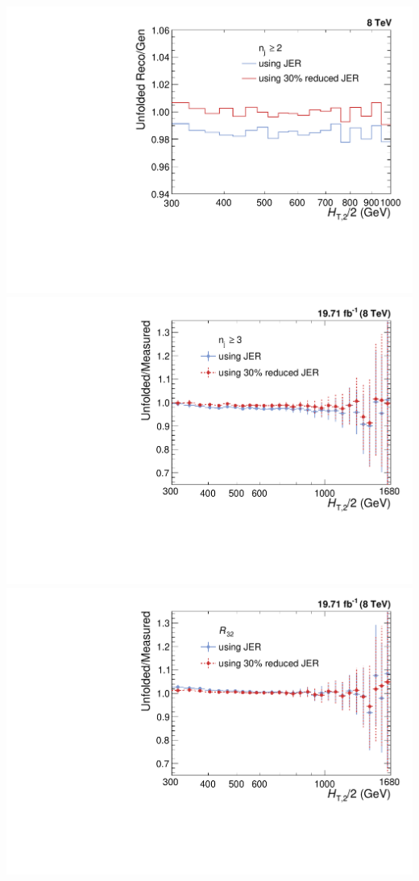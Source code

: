 \documentclass{beamer}
\begin{document}
\begin{frame}
\begin{minipage}[tbp]{0.15\textwidth}
\includegraphics[scale = 0.16]{Plots_HT_2_150/Comparison_closure_2_range.pdf}\\
\includegraphics[scale = 0.16]{Plots_HT_2_150/Ratio_Unfolding_data_NLO_3.pdf}%
\includegraphics[scale = 0.16]{Plots_HT_2_150/Ratio_Unfolding_data_NLO_ratio32.pdf}\\
\end{minipage}
\end{frame}
\end{document}

